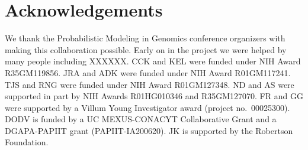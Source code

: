 \documentclass[12pt,halfline,a4paper]{ouparticle}
\begin{document}

\section*{Acknowledgements}
We thank the Probabilistic Modeling in Genomics conference organizers with making this collaboration possible.
Early on in the project we were helped by many people including XXXXXX.
CCK and KEL were funded under NIH Award R35GM119856.
JRA and ADK were funded under NIH Award R01GM117241.
TJS and RNG were funded under NIH Award R01GM127348.
ND and AS were supported in part by NIH Awards R01HG010346 and R35GM127070.
FR and GG were supported by a Villum Young Investigator award (project no.~00025300).
DODV is funded by a UC MEXUS-CONACYT Collaborative Grant and a DGAPA-PAPIIT grant (PAPIIT-IA200620).
JK is supported by the Robertson Foundation.
\end{document}
